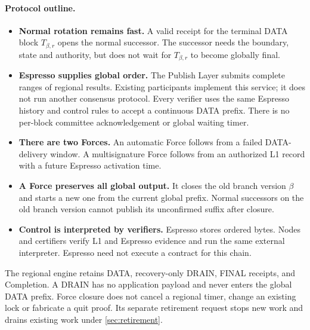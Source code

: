 \documentclass[11pt,a4paper]{article}
\newcounter{protocol}
\begin{document}
\paragraph{Protocol outline.}
\begin{itemize}
\item \textbf{Normal rotation remains fast.} A valid receipt for the
terminal DATA block $T_{\beta,r}$ opens the normal successor. The successor
needs the boundary, state and authority, but does not wait for $T_{\beta,r}$
to become globally final.
\item \textbf{Espresso supplies global order.} The Publish Layer submits
complete ranges of regional results. Existing participants implement this
service; it does not run another consensus protocol. Every verifier uses the same
Espresso history and control rules to accept a continuous DATA prefix.
There is no per-block committee acknowledgement or global waiting timer.
\item \textbf{There are two Forces.} An automatic Force follows from
a failed DATA-delivery window. A multisignature Force follows from an
authorized L1 record with a future Espresso activation time.
\item \textbf{A Force preserves all global output.} It closes the old
branch version $\beta$ and starts a new one from the current
global prefix. Normal successors on the old branch version cannot publish its
unconfirmed suffix after closure.
\item \textbf{Control is interpreted by verifiers.} Espresso stores
ordered bytes. Nodes and certifiers verify L1 and Espresso evidence and
run the same external interpreter. Espresso need not execute a contract
for this chain.
\end{itemize}

The regional engine retains DATA, recovery-only DRAIN, FINAL receipts,
and Completion. A DRAIN has no application payload and never enters the
global DATA prefix. Force closure does not cancel a regional timer,
change an existing lock or fabricate a quit proof. Its separate retirement
request stops new work and drains existing work under \cref{sec:retirement}.
\end{document}
